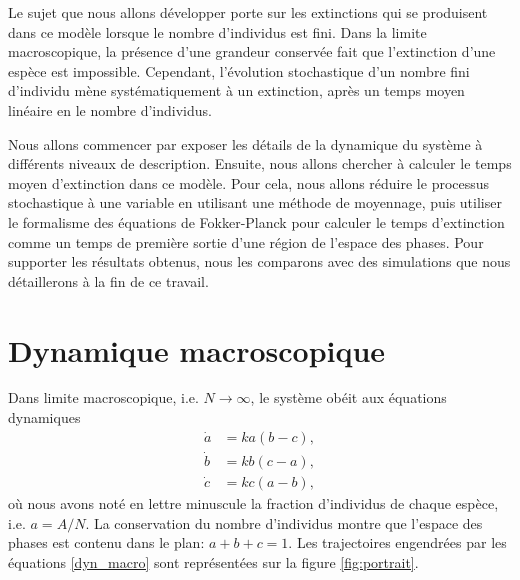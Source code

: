 \documentclass[openany,a4paper,12pt]{article}
\begin{document}
\par Le sujet que nous allons développer porte sur les extinctions qui se produisent dans ce modèle lorsque le nombre d'individus est fini. Dans la limite macroscopique, la présence d'une grandeur conservée fait que l'extinction d'une espèce est impossible. Cependant, l'évolution stochastique d'un nombre fini d'individu mène systématiquement à un extinction, après un temps moyen linéaire en le nombre d'individus. 

\par Nous allons commencer par exposer les détails de la dynamique du système à différents niveaux de description. Ensuite, nous allons chercher à calculer le temps moyen d'extinction dans ce modèle. Pour cela, nous allons réduire le processus stochastique à une variable en utilisant une méthode de moyennage, puis utiliser le formalisme des équations de Fokker-Planck pour calculer le temps d'extinction comme un temps de première sortie d'une région de l'espace des phases. Pour supporter les résultats obtenus, nous les comparons avec des simulations que nous détaillerons à la fin de ce travail. 


\section{Dynamique macroscopique}
\label{section_macro}

\par Dans limite macroscopique, i.e. $N\rightarrow \infty$, le système obéit aux équations dynamiques
%
\begin{equation}\label{dyn_macro}
\begin{split}
	\dot a &= ka(b-c), \\
	\dot b &= kb(c-a), \\
	\dot c &= kc(a-b),
\end{split}
\end{equation}
%
où nous avons noté en lettre minuscule la fraction d'individus de chaque espèce, i.e. $a=A/N$. La conservation du nombre d'individus montre que l'espace des phases est contenu dans le plan: $a+b+c=1$. Les trajectoires engendrées par les équations \ref{dyn_macro} sont représentées sur la figure \ref{fig:portrait}.
\end{document}
